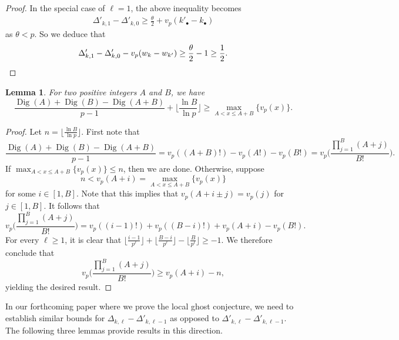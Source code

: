 \documentclass[12pt]{amsart}
\newtheorem{lemma}[subsection]{Lemma}
\theoremstyle{definition}
\numberwithin{equation}{subsection}
\DeclareMathOperator{\Dig}{Dig}
\begin{document}
\begin{proof}
In the special case of $\ell=1$, the above inequality becomes
\begin{align*}
\Delta'_{k,1} - \Delta'_{k,0}\geq \frac \theta 2+v_p(k'_\bullet - k_\bullet)
\end{align*}
as $\theta<p$. So we deduce that
\[
\Delta'_{k,1}-\Delta'_{k,0}-v_p(w_{k} - w_{k'})\geq \frac \theta 2 - 1 \geq \frac 12. \qedhere
\]


\end{proof}


\begin{lemma}
\label{L:elementary Digits lemma}For two positive integers $A$ and $B$, we have 
	\[
	\frac{\Dig(A)+\Dig(B)-\Dig(A+B)}{p-1}+\Big\lfloor \frac{\ln B}{\ln p}\Big\rfloor\geq \max_{A<x\leq A+B}\{ v_p(x) \}.
	\]
\end{lemma}
\begin{proof}
Let $n=\lfloor \frac{\ln B}{\ln p}\rfloor$. First note that
\[
	\frac{\Dig(A)+\Dig(B)-\Dig(A+B)}{p-1}=v_p((A+B)!)-v_p(A!)-v_p(B!)=v_p\Big(\frac{\prod_{j=1}^B (A+j)}{B!} \Big).
	\]
If $\max_{A<x\leq A+B}\{ v_p(x) \}\leq n$, then we are done. Otherwise, suppose 
\[
n<v_p(A+i)=\max_{A<x\leq A+B}\{ v_p(x)\}
\]
for some $i\in [1, B]$. Note that this implies that $v_p(A+i\pm j)=v_p(j)$ for $j\in[1, B]$. It follows that 
\[
v_p\Big(\frac{\prod_{j=1}^B (A+j)}{B!} \Big)=v_p((i-1)!)+v_p((B-i)!)+v_p(A+i)-v_p(B!).
\]
For every $\ell\geq1$, it is clear that $\lfloor \frac{i-1}{p^\ell}\rfloor+\lfloor \frac{B-i}{p^\ell}\rfloor-\lfloor \frac{B}{p^\ell}\rfloor\geq-1$. We therefore conclude that
\[
v_p\Big(\frac{\prod_{j=1}^B (A+j)}{B!} \Big)\geq v_p(A+i)-n,
\]
yielding the desired result.
\end{proof}


In our forthcoming paper where we prove the local ghost conjecture, we need to establish similar bounds for $\Delta_{k, \ell} - \Delta'_{k, \ell-1}$ as opposed to $\Delta'_{k, \ell} - \Delta'_{k, \ell-1}$. The following three lemmas provide results in this direction.
\end{document}
